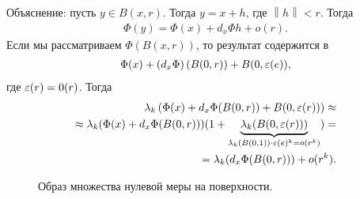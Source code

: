 Объяснение: пусть $y \in B(x, r)$. Тогда $y = x + h$, где $\left\| h \right\| < r$. Тогда 
\begin{align*}
 \Phi(y) = \Phi(x) + d_{x} \Phi h + o(r)
.\end{align*}
Если мы рассматриваем $\Phi(B(x, r))$, то результат содержится в 
\begin{align*}
\Phi(x) + \left( d_x \Phi \right) (B(0, r)) + B(0, \varepsilon(e)),
\end{align*}
 где $\varepsilon(r) = 0(r)$. Тогда
 \begin{align*}
  \lambda_k\left( \Phi(x) + d_x \Phi (B(0, r)) + B(0, \varepsilon(r)) \right) \approx \\
  \approx \lambda_k(\Phi(x) + d_x \Phi(B(0, r)))(1 +  \underbrace{\lambda_k(B(0, \varepsilon(r)))}_{\lambda_k(B(0,1))\cdot \varepsilon(e)^{k} = o(r^{k})} ) = \\
  = \lambda_k(d_x \Phi (B(0, r))) + o(r^{k})
 .\end{align*} 

\begin{figure}[ht]
    \centering
    \caption{Образ множества нулевой меры на поверхности.}
    \label{fig:small_set_on_surface}
\end{figure}

